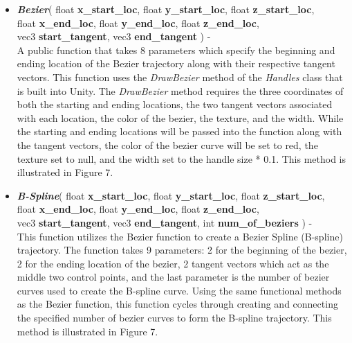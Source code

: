 \documentclass[draftclsnofoot,onecolumn,compsoc]{IEEEtran}
\begin{document}
\begin{itemize}
\item \textbf{\textit{Bezier}}( float \textbf{x\_start\_loc}, float \textbf{y\_start\_loc}, float \textbf{z\_start\_loc},\\
\indent \hspace{10mm} float \textbf{x\_end\_loc}, float \textbf{y\_end\_loc}, float \textbf{z\_end\_loc}, \\
\indent \hspace{10mm}vec3 \textbf{start\_tangent}, vec3 \textbf{end\_tangent} ) -\\
A public function that takes 8 parameters which specify the beginning and ending location of the Bezier trajectory along with their respective tangent vectors. This function uses the \textit{DrawBezier} method of the \textit{Handles} class that is built into Unity. The \textit{DrawBezier} method requires the three coordinates of both the starting and ending locations, the two tangent vectors associated with each location, the color of the bezier, the texture, and the width. While the starting and ending locations will be passed into the function along with the tangent vectors, the color of the bezier curve will be set to red, the texture set to null, and the width set to the handle size * 0.1. This method is illustrated in Figure 7. \\


\item \textbf{\textit{B-Spline}}( float \textbf{x\_start\_loc}, float \textbf{y\_start\_loc}, float \textbf{z\_start\_loc},\\
\indent \hspace{14mm} float \textbf{x\_end\_loc}, float \textbf{y\_end\_loc}, float \textbf{z\_end\_loc}, \\
\indent \hspace{14mm}vec3 \textbf{start\_tangent}, vec3 \textbf{end\_tangent}, int \textbf{num\_of\_beziers} ) -\\
This function utilizes the Bezier function to create a Bezier Spline (B-spline) trajectory. The function takes 9 parameters: 2 for the beginning of the bezier, 2 for the ending location of the bezier, 2 tangent vectors which act as the middle two control points, and the last parameter is the number of bezier curves used to create the B-spline curve. Using the same functional methods as the Bezier function, this function cycles through creating and connecting the specified number of bezier curves to form the B-spline trajectory. This method is illustrated in Figure 7. \\



\end{itemize}
\end{document}
